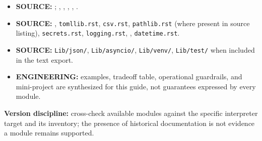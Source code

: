 \documentclass[
  11pt,
]{report}
\newcommand{\passthrough}[1]{#1}
\providecommand{\tightlist}{%
  \setlength{\itemsep}{0pt}\setlength{\parskip}{0pt}}
\begin{document}
\begin{itemize}
\tightlist
\item
  \textbf{SOURCE:} ;
  ,
  ,
  ,
  ,
  .
\item
  \textbf{SOURCE:} ,
  \passthrough{\lstinline!tomllib.rst!},
  \passthrough{\lstinline!csv.rst!},
  \passthrough{\lstinline!pathlib.rst!} (where present in source
  listing), \passthrough{\lstinline!secrets.rst!},
  \passthrough{\lstinline!logging.rst!},
  ,
  \passthrough{\lstinline!datetime.rst!}.
\item
  \textbf{SOURCE:} \passthrough{\lstinline!Lib/json/!},
  \passthrough{\lstinline!Lib/asyncio/!},
  \passthrough{\lstinline!Lib/venv/!},
  \passthrough{\lstinline!Lib/test/!} when included in the text export.
\item
  \textbf{ENGINEERING:} examples, tradeoff table, operational
  guardrails, and mini-project are synthesized for this guide, not
  guarantees expressed by every module.
\end{itemize}

\textbf{Version discipline:} cross-check available modules against the
specific interpreter target and its
 inventory; the presence of
historical documentation is not evidence a module remains supported.
\end{document}
